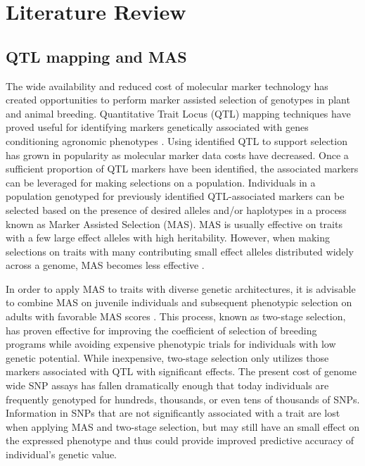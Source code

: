 \section{Literature Review} \label{sec:lit-review}

\subsection*{QTL mapping and MAS}

The wide availability and reduced cost of molecular marker technology
has created opportunities to perform marker assisted selection of genotypes
in plant and animal breeding. Quantitative Trait Locus (QTL) mapping techniques
have proved useful for identifying markers genetically associated with genes 
conditioning agronomic phenotypes \citep{miles2008}. Using identified QTL to 
support selection has grown in popularity as molecular marker data costs have 
decreased. Once a sufficient proportion of QTL markers have been identified, 
the associated markers can be leveraged for making selections on a population. 
Individuals in a population genotyped for previously identified QTL-associated 
markers can be selected based on the presence of desired alleles 
and/or haplotypes in a process known as Marker Assisted Selection (MAS). 
MAS is usually effective on traits with a few large effect alleles with high 
heritability. However, when making selections on traits with many contributing 
small effect alleles distributed widely across a genome, MAS becomes less 
effective \citep{heffner2009}. 

In order to apply MAS to traits with diverse genetic architectures, it is
advisable to combine MAS on juvenile individuals and subsequent phenotypic
selection on adults with favorable MAS scores \citep{lande1990}. This process, 
known as two-stage selection, has proven effective for improving
the coefficient of selection of breeding programs while avoiding expensive phenotypic
trials for individuals with low genetic potential. While inexpensive, two-stage selection 
only utilizes those markers associated with QTL with significant effects. The present cost of
genome wide SNP assays has fallen dramatically enough that today individuals are
frequently genotyped for hundreds, thousands, or even tens of thousands of SNPs. 
Information in SNPs that are not significantly associated with a trait are lost 
when applying MAS and two-stage selection, but may still have an small effect on the
expressed phenotype and thus could provide improved predictive 
accuracy of individual's genetic value.

